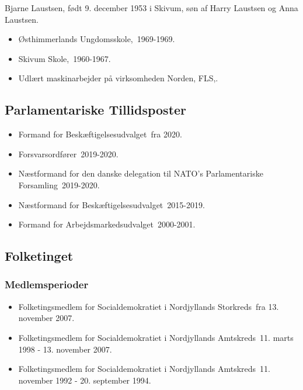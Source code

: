 \documentclass[11pt, a4paper]{awesome-cv}
\begin{document}
\makecvheader[R]
\makelettertitle
\begin{cvletter}
Bjarne Laustsen, født 9. december 1953 i Skivum, søn af Harry Laustsen og Anna Laustsen.

\begin{itemize}
\item Østhimmerlands Ungdomsskole, 1969-1969.
\item Skivum Skole, 1960-1967.
\item Udlært maskinarbejder på virksomheden Norden, FLS,.
\end{itemize}
\subsection*{Parlamentariske Tillidsposter}
\begin{itemize}
\item Formand for Beskæftigelsesudvalget fra 2020.
\item Forsvarsordfører 2019-2020.
\item Næstformand for den danske delegation til NATO's Parlamentariske Forsamling 2019-2020.
\item Næstformand for Beskæftigelsesudvalget 2015-2019.
\item Formand for Arbejdsmarkedsudvalget 2000-2001.
\end{itemize}
\subsection*{Folketinget}
\subsubsection*{Medlemsperioder}
\begin{itemize}
\item Folketingsmedlem for Socialdemokratiet i Nordjyllands Storkreds fra 13. november 2007.
\item Folketingsmedlem for Socialdemokratiet i Nordjyllands Amtskreds 11. marts 1998 - 13. november 2007.
\item Folketingsmedlem for Socialdemokratiet i Nordjyllands Amtskreds 11. november 1992 - 20. september 1994.
\end{itemize}

\end{cvletter}
\end{document}
